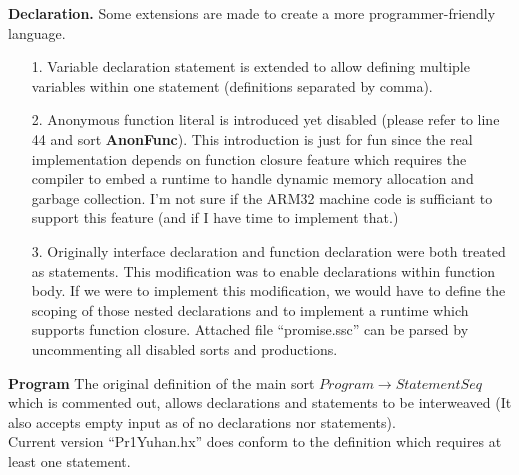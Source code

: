 \documentclass[12pt]{article}
\begin{document}
\vspace{4mm}
{\bf Declaration.} Some extensions are made to create a more programmer-friendly language.

\begin{itemize}
\item[1.] Variable declaration statement is extended to allow defining multiple variables
  within one statement (definitions separated by comma).
\item[2.] Anonymous function literal is introduced yet disabled (please refer to line 44 and sort
  {\bf AnonFunc}). This introduction is just for fun since the real implementation depends on function
  closure feature which requires the compiler to embed a runtime to handle dynamic memory allocation
  and garbage collection. I'm not sure if the ARM32 machine code is sufficiant to support this feature
  (and if I have time to implement that.)
\item[3.] Originally interface declaration and function declaration were both treated as statements.
  This modification was to enable declarations within function body. If we were to implement this
  modification, we would have to define the scoping of those nested declarations and to implement
  a runtime which supports function closure. Attached file ``promise.ssc'' can be parsed by uncommenting
  all disabled sorts and productions.
\end{itemize}

\vspace{4mm}
{\bf Program} The original definition of the main sort $Program \rightarrow StatementSeq$
which is commented out, allows declarations and statements to be interweaved (It also accepts
empty input as of no declarations nor statements).\\
Current version ``Pr1Yuhan.hx'' does conform to the definition which requires at least one statement.
\end{document}
